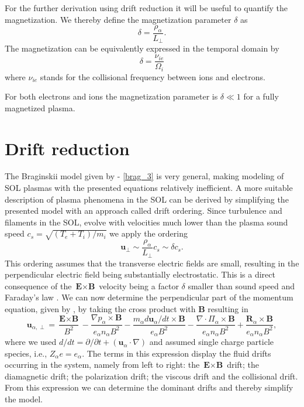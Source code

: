 For the further derivation using drift reduction it will be useful to quantify the magnetization. We thereby define the magnetization parameter $\delta$ as 
\begin{equation}
	\delta = \frac{\rho_\alpha}{L_\perp}.
\end{equation}
The magnetization can be equivalently expressed in the temporal domain by 
\begin{equation}
	\delta = \frac{\nu_{ie}}{\Omega_i}
\end{equation}
where $\nu_{ie}$ stands for the collisional frequency between ions and electrons.

For both electrons and ions the magnetization parameter is $\delta \ll 1$ for a fully magnetized plasma. 


\section{Drift reduction}
The Braginskii model given by  - \eqref{brag_3} is very general, making modeling of SOL plasmas with the presented equations relatively inefficient. A more suitable description of plasma phenomena in the SOL can be derived by simplifying the presented model with an approach called drift ordering. Since turbulence and filaments in the SOL, evolve with velocities much lower than the plasma sound speed $c_s = \sqrt{(T_e+T_i)/m_i}$ we apply the ordering
\begin{equation}
	\textbf{u}_\perp \sim \frac{\rho_\alpha}{L_\perp} c_s \sim \delta c_s.
\end{equation}
This ordering assumes that the transverse electric fields are small, resulting in the perpendicular electric field being substantially electrostatic. This is a direct consequence of the $\textbf{E}\times\textbf{B}$ velocity being a factor $\delta$ smaller than sound speed and Faraday's law \cite{militellobook}. We can now determine the perpendicular part of the momentum equation, given by , by taking the cross product with $\textbf{B}$ resulting in
\begin{equation}
	\textbf{u}_{\alpha,\perp} = \frac{\textbf{E}\times\textbf{B}}{B^2} - \frac{\nabla p_\alpha \times \textbf{B}}{e_\alpha n_\alpha B^2} - \frac{m_\alpha d \textbf{u}_\alpha/d t \times \textbf{B}}{e_\alpha B^2} - \frac{\nabla \cdot \Pi_\alpha\times\textbf{B}}{e_\alpha n_\alpha B^2} + \frac{\textbf{R}_\alpha \times \textbf{B}}{e_\alpha n_\alpha B^2},
\end{equation}
where we used $d/dt = \partial/\partial t + (\textbf{u}_\alpha\cdot \nabla)$ and assumed single charge particle species, i.e., $Z_\alpha e = e_\alpha$. The terms in this expression display the fluid drifts occurring in the system, namely from left to right: the $\textbf{E}\times\textbf{B}$ drift; the diamagnetic drift; the polarization drift; the viscous drift and the collisional drift. From this expression we can determine the dominant drifts and thereby simplify the model.

